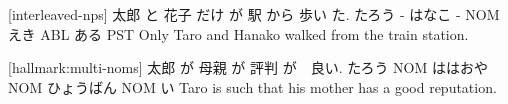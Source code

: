 [interleaved-nps]
太郎  と 花子  だけ が  駅  から 歩い  た.
たろう - はなこ -  NOM えき ABL ある  PST
Only Taro and Hanako walked from the train station.

[hallmark:multi-noms]
太郎  が   母親    が   評判      が　良い.
たろう NOM ははおや NOM ひょうばん NOM い
Taro is such that his mother has a good reputation.
